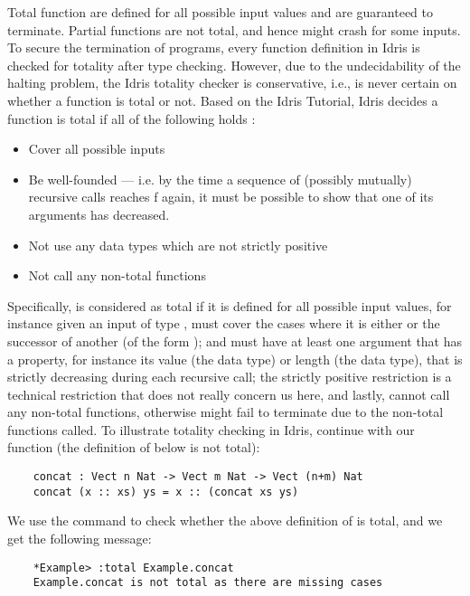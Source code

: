Total function are defined for all possible input values and are guaranteed to terminate. Partial functions are not total, and hence might crash for some inputs. To secure the termination of programs, every function definition in Idris is checked for totality after type checking. However, due to the undecidability of the halting problem, the Idris totality checker is conservative, i.e., is never certain on whether a function is total or not. Based on the Idris Tutorial, Idris decides a function  is total if all of the following holds \cite{idris_tutorial}: 
\begin{itemize}
  \item Cover all possible inputs
  \item Be well-founded — i.e. by the time a sequence of (possibly mutually) recursive calls reaches f again, it must be possible to show that one of its arguments has decreased.
  \item Not use any data types which are not strictly positive
  \item Not call any non-total functions
\end{itemize}
Specifically,  is considered as total if it is defined for all possible input values, for instance given an input of type ,  must cover the cases where it is either  or the successor of another  (of the form ); and must have at least one argument that has a property, for instance its value (the  data type) or length (the  data type), that is strictly decreasing during each recursive call; the strictly positive restriction is a technical restriction that does not really concern us here, and lastly,  cannot call any non-total functions, otherwise  might fail to terminate due to the non-total functions called. To illustrate totality checking in Idris, continue with our  function (the definition of  below is not total):
\begin{lstlisting}
    concat : Vect n Nat -> Vect m Nat -> Vect (n+m) Nat
    concat (x :: xs) ys = x :: (concat xs ys)
\end{lstlisting}

We use the  command to check whether the above definition of  is total, and we get the following message:
\begin{lstlisting}
    *Example> :total Example.concat
    Example.concat is not total as there are missing cases
\end{lstlisting}

